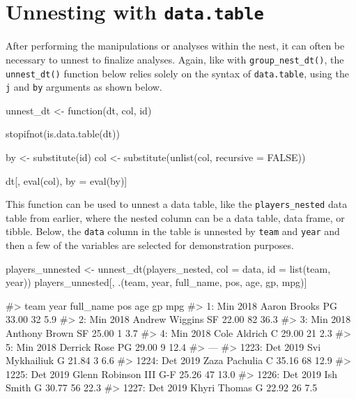 \hypertarget{unnesting-with-data.table}{%
\section{\texorpdfstring{Unnesting with
\texttt{data.table}}{Unnesting with data.table}}\label{unnesting-with-data.table}}

After performing the manipulations or analyses within the nest, it can
often be necessary to unnest to finalize analyses. Again, like with
\texttt{group\_nest\_dt()}, the \texttt{unnest\_dt()} function below
relies solely on the syntax of \texttt{data.table}, using the \texttt{j}
and \texttt{by} arguments as shown below.

\begin{Schunk}
\begin{Sinput}
unnest_dt <- function(dt, col, id){
  stopifnot(is.data.table(dt))
  
  by <- substitute(id)
  col <- substitute(unlist(col, recursive = FALSE))
  
  dt[, eval(col), by = eval(by)]
}
\end{Sinput}
\end{Schunk}

This function can be used to unnest a data table, like the
\texttt{players\_nested} data table from earlier, where the nested
column can be a data table, data frame, or tibble. Below, the
\texttt{data} column in the table is unnested by \texttt{team} and
\texttt{year} and then a few of the variables are selected for
demonstration purposes.

\begin{Schunk}
\begin{Sinput}
players_unnested <- unnest_dt(players_nested, 
          col = data, 
          id = list(team, year))
players_unnested[, .(team, year, full_name, pos, age, gp, mpg)]
\end{Sinput}
\begin{Soutput}
#>       team year          full_name pos   age gp  mpg
#>    1:  Min 2018       Aaron Brooks  PG 33.00 32  5.9
#>    2:  Min 2018     Andrew Wiggins  SF 22.00 82 36.3
#>    3:  Min 2018      Anthony Brown  SF 25.00  1  3.7
#>    4:  Min 2018       Cole Aldrich   C 29.00 21  2.3
#>    5:  Min 2018       Derrick Rose  PG 29.00  9 12.4
#>   ---                                               
#> 1223:  Det 2019     Svi Mykhailiuk   G 21.84  3  6.6
#> 1224:  Det 2019      Zaza Pachulia   C 35.16 68 12.9
#> 1225:  Det 2019 Glenn Robinson III G-F 25.26 47 13.0
#> 1226:  Det 2019          Ish Smith   G 30.77 56 22.3
#> 1227:  Det 2019       Khyri Thomas   G 22.92 26  7.5
\end{Soutput}
\end{Schunk}

